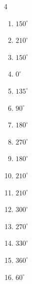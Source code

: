 \begin{multicols}{4}
\begin{enumerate}
  \item $\displaystyle 150^{\circ}$

  \item $\displaystyle 210^{\circ}$

  \item $\displaystyle 150^{\circ}$

  \item $\displaystyle 0^{\circ}$
        \phantom{$\displaystyle =0$}

  \item $\displaystyle 135^{\circ}$

  \item $\displaystyle 90^{\circ}$

  \item $\displaystyle 180^{\circ}$
        \phantom{$\displaystyle =\pi$}

  \item $\displaystyle 270^{\circ}$

  \item $\displaystyle 180^{\circ}$
        \phantom{$\displaystyle =\pi$}

  \item $\displaystyle 210^{\circ}$

  \item $\displaystyle 210^{\circ}$

\columnbreak %

  \item $\displaystyle 300^{\circ}$

  \item $\displaystyle 270^{\circ}$

  \item $\displaystyle 330^{\circ}$

  \item $\displaystyle 360^{\circ}$
        \phantom{$\displaystyle =2\pi$}

  \item $\displaystyle 60^{\circ}$


\end{enumerate}
\end{multicols}
